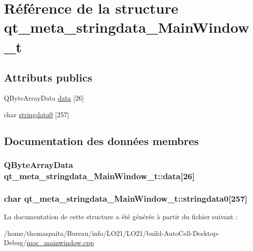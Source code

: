 \hypertarget{structqt__meta__stringdata___main_window__t}{}\section{Référence de la structure qt\+\_\+meta\+\_\+stringdata\+\_\+\+Main\+Window\+\_\+t}
\label{structqt__meta__stringdata___main_window__t}
\subsection*{Attributs publics}
\begin{DoxyCompactItemize}
\item 
Q\+Byte\+Array\+Data \hyperlink{structqt__meta__stringdata___main_window__t_a48f255bc47fc5d9f118e582b8447d10a}{data} \mbox{[}26\mbox{]}
\item 
char \hyperlink{structqt__meta__stringdata___main_window__t_a2fa46444eb1ac35dca9266fcfdf74b9e}{stringdata0} \mbox{[}257\mbox{]}
\end{DoxyCompactItemize}


\subsection{Documentation des données membres}
\subsubsection[{\texorpdfstring{data}{data}}]{\setlength{\rightskip}{0pt plus 5cm}Q\+Byte\+Array\+Data qt\+\_\+meta\+\_\+stringdata\+\_\+\+Main\+Window\+\_\+t\+::data\mbox{[}26\mbox{]}}\hypertarget{structqt__meta__stringdata___main_window__t_a48f255bc47fc5d9f118e582b8447d10a}{}\label{structqt__meta__stringdata___main_window__t_a48f255bc47fc5d9f118e582b8447d10a}
\subsubsection[{\texorpdfstring{stringdata0}{stringdata0}}]{\setlength{\rightskip}{0pt plus 5cm}char qt\+\_\+meta\+\_\+stringdata\+\_\+\+Main\+Window\+\_\+t\+::stringdata0\mbox{[}257\mbox{]}}\hypertarget{structqt__meta__stringdata___main_window__t_a2fa46444eb1ac35dca9266fcfdf74b9e}{}\label{structqt__meta__stringdata___main_window__t_a2fa46444eb1ac35dca9266fcfdf74b9e}


La documentation de cette structure a été générée à partir du fichier suivant \+:\begin{DoxyCompactItemize}
\item 
/home/thomaspaita/\+Bureau/info/\+L\+O21/\+L\+O21/build-\/\+Auto\+Cell-\/\+Desktop-\/\+Debug/\hyperlink{moc__mainwindow_8cpp}{moc\+\_\+mainwindow.\+cpp}\end{DoxyCompactItemize}
